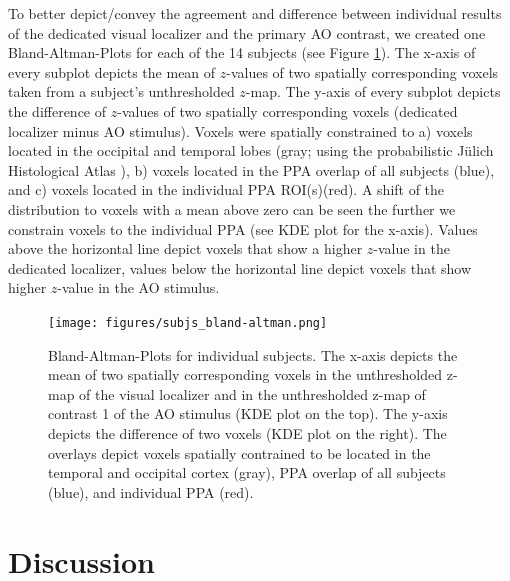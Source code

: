 \documentclass[english]{article}
\begin{document}
To better depict/convey the agreement and difference between individual results
of the dedicated visual localizer and the primary AO contrast, we created one
Bland-Altman-Plots for each of the 14 subjects (see Figure
\ref{fig:bland-altman}).
The x-axis of every subplot depicts the mean of $z$-values of two spatially
corresponding voxels taken from a subject's unthresholded $z$-map.
The y-axis of every subplot depicts the difference of $z$-values of two
spatially corresponding voxels (dedicated localizer minus AO stimulus).
Voxels were spatially constrained to a) voxels located in the occipital and
temporal lobes (gray; using the probabilistic Jülich Histological Atlas
\citep{eickhoff2005toolbox, eickhoff2007assignment}), b) voxels located in the
PPA overlap of all subjects (blue), and c) voxels located in the individual PPA
ROI(s)(red).
A shift of the distribution to voxels with a mean above zero can be seen the
further we constrain voxels to the individual PPA (see KDE plot for the x-axis).
Values above the horizontal line depict voxels that show a higher $z$-value in
the dedicated localizer, values below the horizontal line depict voxels that
show higher $z$-value in the AO stimulus.

\begin{figure} \centering
    \texttt{[image: figures/subjs\_bland-altman.png]}
    \caption{Bland-Altman-Plots for individual subjects. The x-axis depicts the
        mean of two spatially corresponding voxels in the unthresholded z-map of
        the visual localizer and in the unthresholded z-map of contrast 1 of the
        AO stimulus (KDE plot on the top). The y-axis depicts the difference of
        two voxels (KDE plot on the right). The overlays depict voxels spatially
        contrained to be located in the temporal and occipital cortex (gray),
    PPA overlap of all subjects (blue), and individual PPA (red).}
    \label{fig:bland-altman} \end{figure}


\section{Discussion}

\end{document}
